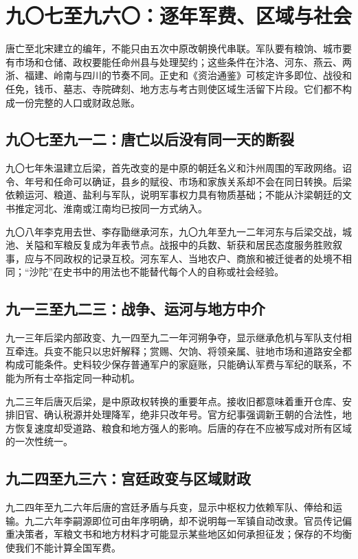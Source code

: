 \section{九〇七至九六〇：逐年军费、区域与社会}
\label{sec:five-annual-military-fiscal-regional-society}

唐亡至北宋建立的编年，不能只由五次中原改朝换代串联。军队要有粮饷、城市要有市场和仓储、政权要能任命州县与处理契约；这些条件在汴洛、河东、燕云、两浙、福建、岭南与四川的节奏不同。正史和《资治通鉴》可核定许多即位、战役和任免，钱币、墓志、寺院碑刻、地方志与考古则使区域生活留下片段。它们都不构成一份完整的人口或财政总账。

\subsection{九〇七至九一二：唐亡以后没有同一天的断裂}

九〇七年朱温建立后梁，首先改变的是中原的朝廷名义和汴州周围的军政网络。诏令、年号和任命可以确证，县乡的赋役、市场和家族关系却不会在同日转换。后梁依赖运河、粮道、盐利与军队，说明军事权力具有物质基础；不能从汴梁朝廷的文书推定河北、淮南或江南均已按同一方式纳入。

九〇八年李克用去世、李存勖继承河东，九〇九年至九一二年河东与后梁交战，城池、关隘和军粮反复成为年表节点。战报中的兵数、斩获和居民态度服务胜败叙事，应与不同政权的记录互校。河东军人、当地农户、商旅和被迁徙者的处境不相同；“沙陀”在史书中的用法也不能替代每个人的自称或社会经验。

\subsection{九一三至九二三：战争、运河与地方中介}

九一三年后梁内部政变、九一四至九二一年河朔争夺，显示继承危机与军队支付相互牵连。兵变不能只以忠奸解释；赏赐、欠饷、将领亲属、驻地市场和道路安全都构成可能条件。史料较少保存普通军户的家庭账，只能确认军费与军纪的联系，不能为所有士卒指定同一种动机。

九二三年后唐灭后梁，是中原政权转换的重要年点。接收旧都意味着重开仓库、安排旧官、确认税源并处理降军，绝非只改年号。官方纪事强调新王朝的合法性，地方恢复速度却受道路、粮食和地方强人的影响。后唐的存在不应被写成对所有区域的一次性统一。

\subsection{九二四至九三六：宫廷政变与区域财政}

九二四年至九二六年后唐的宫廷矛盾与兵变，显示中枢权力依赖军队、俸给和运输。九二六年李嗣源即位可由年序明确，却不说明每一军镇自动改隶。官员传记偏重决策者，军粮文书和地方材料才可能显示某些地区如何承担征发；保存的不均衡使我们不能计算全国军费。

